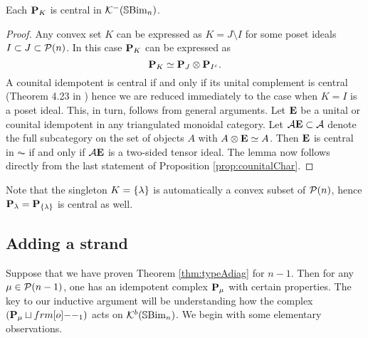 \begin{lemma}\label{lemma:projcentral}
Each ${\mathbf P}_K$ is central in ${\mathcal{K}}^-({\mathbb{S}}{\rm Bim }_n)$.
\end{lemma}
\begin{proof}
Any convex set $K$ can be expressed as $K=J\setminus I$ for some poset ideals $I\subset J\subset {\mathcal{P}}(n)$.  In this case ${\mathbf P}_K$ can be expressed as
\[
{\mathbf P}_K \simeq {\mathbf P}_J\otimes {\mathbf P}_{I^c}.
\]
A counital idempotent is central if and only if its unital complement is central (Theorem 4.23 in \cite{Hog17a}) hence we are reduced immediately to the case when $K=I$ is a poset ideal. 
This, in turn, follows from general arguments.  Let ${\mathbf E}$ be a unital or counital idempotent in any triangulated monoidal category.  Let ${\mathcal{A}} {\mathbf E}\subset {\mathcal{A}}$ denote the full subcategory on the set of objects $A$ with $A\otimes {\mathbf E}\simeq A$.  Then ${\mathbf E}$ is central in $\AC$ if and only if ${\mathcal{A}} {\mathbf E}$ is a two-sided tensor ideal.   The lemma now follows directly from the last statement of Proposition \ref{prop:counitalChar}.
\end{proof}

Note that the singleton $K=\{\lambda\}$ is automatically a convex subset of ${\mathcal{P}}(n)$, hence ${\mathbf P}_\lambda ={\mathbf P}_{\{\lambda\}}$ is central as well.




\subsection{Adding a strand}

Suppose that we have proven Theorem \ref{thm:typeAdiag} for $n-1$. Then for any $\mu \in {\mathcal{P}}(n-1)$, one has an idempotent complex ${\mathbf P}_{\mu}$ with certain properties. The key to our inductive argument will be understanding how the complex $(\PB_{\mu} \sqcup \one_1)$ acts on ${\mathcal{K}}^b({\mathbb{S}}{\rm Bim }_n)$. We begin with some elementary observations.

